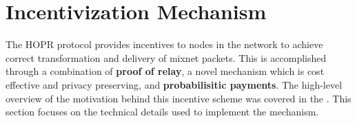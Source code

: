 \section{Incentivization Mechanism}
\label{sec:incentiviationmechanism}

The HOPR protocol provides incentives to nodes in the network to achieve correct transformation and delivery of mixnet packets. This is accomplished through a combination of \textbf{proof of relay}, a novel mechanism which is cost effective and privacy preserving, and \textbf{probabilisitic payments}. The high-level overview of the motivation behind this incentive scheme was covered in the . This section focuses on the technical details used to implement the mechanism.






